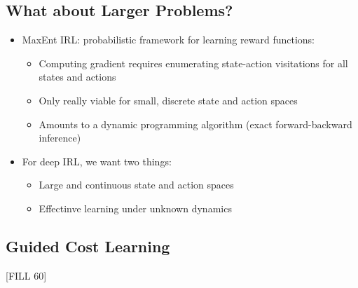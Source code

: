 \documentclass[10pt]{article}
\begin{document}
\subsection*{What about Larger Problems?}
\begin{itemize}
	\item MaxEnt IRL: probabilistic framework for learning reward functions:
	\begin{itemize}
        \item Computing gradient requires enumerating state-action visitations for all states and actions
        \item Only really viable for small, discrete state and action spaces
        \item Amounts to a dynamic programming algorithm (exact forward-backward inference)
    \end{itemize}
	\item For deep IRL, we want two things:
	\begin{itemize}
        \item Large and continuous state and action spaces
        \item Effectinve learning under unknown dynamics
    \end{itemize}
\end{itemize}

\subsection*{Guided Cost Learning}
[FILL 60]
\end{document}
